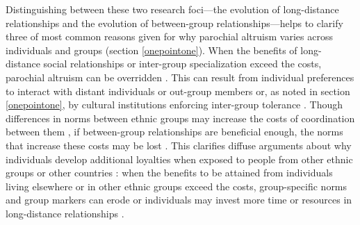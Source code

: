 \documentclass[bibauthoryear]{aa}
\begin{document}
Distinguishing between these two research foci---the evolution of long-distance relationships and the evolution of between-group relationships---helps to clarify three of most common reasons given for why parochial altruism varies across individuals and groups (section \ref{onepointone}). When the benefits of long-distance social relationships or inter-group specialization exceed the costs, parochial altruism can be overridden \citep[e.g.,][]{bellmoya}. This can result from individual preferences to interact with distant individuals \citep{pisor2019evolution} or out-group members \citep{moya2015different, brewer1976ethnocentrism} or, as noted in section \ref{onepointone}, by cultural institutions enforcing inter-group tolerance \citep{fearon1996explaining, fry2018evolutionary}. Though differences in norms between ethnic groups may increase the costs of coordination between them \citep{bellmoya, habyarimana2007does, mcelreath2003shared}, if between-group relationships are beneficial enough, the norms that increase these costs may be lost \citep{bunce2017interethnic, bunce2018sustainability}. This clarifies diffuse arguments about why individuals develop additional loyalties when exposed to people from other ethnic groups or other countries \citep{brewer1976ethnocentrism, beck2006cosmopolitan, hruschka2013economic, buchan2009globalization, fukuyama2001social, mau2008cosmopolitan, singer2011expanding}: when the benefits to be attained from individuals living elsewhere or in other ethnic groups exceed the costs, group-specific norms and group markers can erode \citep{bunce2018sustainability, moya2015different}  or individuals may invest more time or resources in long-distance relationships \citep{braun1982evolution, pisor2019evolution, minnis1985social, wiessner1982risk}.
\end{document}
